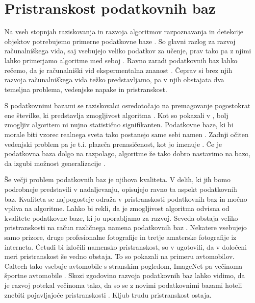 \section{Pristranskost podatkovnih baz}
Na vseh stopnjah raziskovanja in razvoja algoritmov razpoznavanja in detekcije objektov potrebujemo primerne podatkovne baze \cite{ponce2006dataset}. So glavni razlog za razvoj računalniškega vida, saj vsebujejo veliko podatkov za učenje, prav tako pa z njimi lahko primerjamo algoritme med seboj \cite{torralba2011unbiased}. Ravno zaradi podatkovnih baz lahko rečemo, da je računalniški vid ekspermentalna znanost \cite{torralba2011unbiased}. Čeprav si brez njih razvoja računalniškega vida težko predstavljamo, pa v njih obstajata dva temeljna problema, vedenjske napake in pristranskost. 

S podatkovnimi bazami se raziskovalci osredotočajo na premagovanje pogostokrat ene številke, ki predstavlja zmogljivost algoritma \cite{torralba2011unbiased}. Kot so pokazali v \cite{?}, bolj zmogljiv algoritem ni nujno statistično signifikanten.  Podatkovne baze, ki bi morale biti vzorec realnega sveta tako postanejo same sebi namen \cite{torralba2011unbiased}. Zadnji očiten vedenjski problem pa je t.i. plazeča prenasičenost, kot jo imenuje \cite{torralba2011unbiased}. Če je podatkovna baza dolgo na razpolago, algoritme že tako dobro nastavimo na bazo, da izgubi možnost generalizacije \cite{torralba2011unbiased}.

Še večji problem podatkovnih baz je njihova kvaliteta. V delih, ki jih bomo podrobneje predstavili v nadaljevanju, opisujejo ravno ta aspekt podatkovnih baz. Kvaliteta se najpogosteje odraža v pristranskosti podatkovnih baz in močno vpliva na algoritme. Lahko bi rekli, da je zmogljivost algoritma odvisna od kvalitete podatkovne baze, ki jo uporabljamo za razvoj. Seveda obstaja veliko pristranskosti na račun različnega namena podatkovnih baz \cite{torralba2011unbiased}. Nekatere vsebujejo samo prizore, druge profesionalne fotografije in tretje amaterske fotografije iz interneta. Četudi bi izločili namensko pristranskost, so v \cite{torralba2011unbiased} ugotovili, da v določeni meri pristranskost še vedno obstaja. To so pokazali na primeru avtomobilov. Caltech tako vsebuje avtomobile s stranskim pogledom, ImageNet pa večinoma športne avtomobile \cite{torralba2011unbiased}. Skozi zgodovino razvoja podatkovnih baz lahko vidimo, da je razvoj potekal večinoma tako, da so se z novimi podatkovnimi bazami hoteli znebiti pojavljajoče pristranskosti \cite{torralba2011unbiased}. Kljub trudu pristranskost ostaja.


